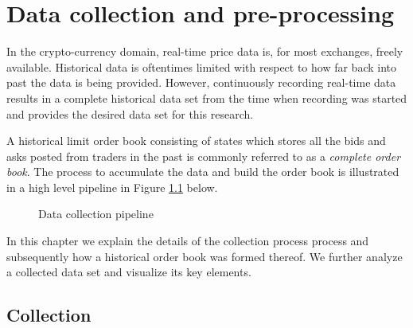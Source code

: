 \chapter{Data collection and pre-processing}
\label{chap:data}

In the crypto-currency domain, real-time price data is, for most exchanges, freely available. Historical data is oftentimes limited with respect to how far back into past the data is being provided. However, continuously recording real-time data results in a complete historical data set from the time when recording was started and provides the desired data set for this research.

A historical limit order book consisting of states which stores all the bids and asks posted from traders in the past is commonly referred to as a \textit{complete order book}.
The process to accumulate the data and build the order book is illustrated in a high level pipeline in Figure \ref{fig:data-pipeline} below.
\begin{figure}[H]
    \centering
    \caption{Data collection pipeline}
    \label{fig:data-pipeline}
\end{figure}
\hfill
In this chapter we explain the details of the collection process process and subsequently how a historical order book was formed thereof.
We further analyze a collected data set and visualize its key elements.

\section{Collection}

